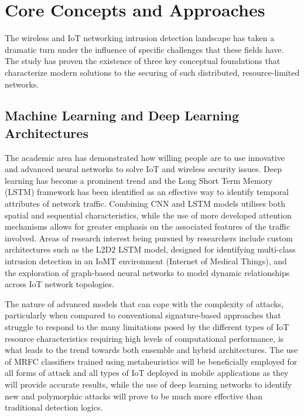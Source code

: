 \documentclass[12pt]{article}
\begin{document}
	\section{Core Concepts and Approaches}
	The wireless and IoT networking intrusion detection landscape has taken a dramatic turn under the influence of specific challenges that these fields have. The study has proven the existence of three key conceptual foundations that characterize modern solutions to the securing of such distributed, resource-limited networks.



\subsection{Machine Learning and Deep Learning Architectures}
    The academic area has demonstrated how willing people are to use innovative and advanced neural networks to solve IoT and wireless security issues. Deep learning has become a prominent trend and the Long Short Term Memory (LSTM) framework has been identified as an effective way to identify temporal attributes of network traffic. Combining CNN and LSTM models utilises both spatial and sequential characteristics, while the use of more developed attention mechanisms allows for greater emphasis on the associated features of the traffic involved. Areas of research interest being pursued by researchers include custom architectures such as the L2D2 LSTM model, designed for identifying multi-class intrusion detection in an IoMT environment (Internet of Medical Things), and the exploration of graph-based neural networks to model dynamic relationships across IoT network topologies.

The nature of advanced models that can cope with the complexity of attacks, particularly when compared to conventional signature-based approaches that struggle to respond to the many limitations posed by the different types of IoT resource characteristics requiring high levels of computational performance, is what leads to the trend towards both ensemble and hybrid architectures. The use of MRFC classifiers trained using metaheuristics will be beneficially employed for all forms of attack and all types of IoT deployed in mobile applications as they will provide accurate results, while the use of deep learning networks to identify new and polymorphic attacks will prove to be much more effective than traditional detection logics.
	
\end{document}
